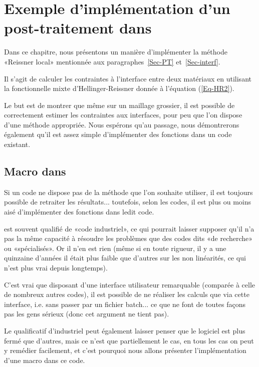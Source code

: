 \section{Exemple d'implémentation d'un post-traitement dans \ansys}

Dans ce chapitre, nous présentons un manière d'implémenter la méthode «Reissner local» mentionnée aux paragraphes~\ref{Sec-PT} et~\ref{Sec-interf}.

Il s'agit de calculer les contraintes à l'interface entre deux matériaux en utilisant la fonctionnelle mixte d'Hellinger-Reissner
donnée à l'équation (\ref{Eq-HR2}).

\medskip
Le but est de montrer que même sur un maillage grossier, il est possible de correctement estimer les contraintes aux interfaces, pour peu que l'on dispose d'une méthode appropriée. Nous espérons qu'au passage, nous démontrerons également qu'il est assez simple d'implémenter des fonctions dans un code existant.


\medskip
\subsection{Macro dans \ansys}

Si un code ne dispose pas de la méthode que l'on souhaite utiliser, il est toujours possible de retraiter les résultats... toutefois, selon les codes, il est plus ou moins aisé d'implémenter des fonctions dans ledit code.

\medskip
\ansys est souvent qualifié de «code industriel», ce qui pourrait laisser supposer qu'il n'a pas la même capacité à résoudre les problèmes que des codes dits «de recherche» ou «spécialisés». Or il n'en est rien (même si en toute rigueur, il y a une quinzaine d'années il était plus faible que d'autres sur les non linéarités, ce qui n'est plus vrai depuis longtemps).

C'est vrai que disposant d'une interface utilisateur remarquable (comparée à celle de nombreux autres codes), il est possible de ne réaliser les calculs que via cette interface, i.e. sans passer par un fichier batch... ce que ne font de toutes façons pas les gens sérieux (donc cet argument ne tient pas).

Le qualificatif d'industriel peut également laisser penser que le logiciel est plus fermé que d'autres, mais ce n'est que partiellement le cas, en tous les cas on peut y remédier facilement, et c'est pourquoi nous allons présenter l'implémentation d'une macro dans ce code.

